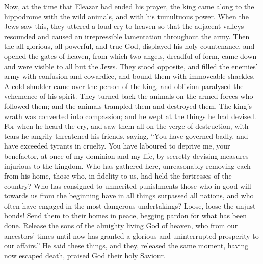  Now, at the time that Eleazar had ended his prayer, the
king came along to the hippodrome with the wild animals, and with his
tumultuous power.  When the Jews saw this, they uttered a
loud cry to heaven so that the adjacent valleys resounded and caused an
irrepressible lamentation throughout the army.  Then the
all-glorious, all-powerful, and true God, displayed his holy
countenance, and opened the gates of heaven, from which two angels,
dreadful of form, came down and were visible to all but the Jews.
 They stood opposite, and filled the enemies' army with
confusion and cowardice, and bound them with immoveable shackles.
 A cold shudder came over the person of the king, and
oblivion paralysed the vehemence of his spirit.  They
turned back the animals on the armed forces who followed them; and the
animals trampled them and destroyed them.  The king's wrath
was converted into compassion; and he wept at the things he had devised.
 For when he heard the cry, and saw them all on the verge
of destruction, with tears he angrily threatened his friends, saying,
 ``You have governed badly, and have exceeded tyrants in
cruelty. You have laboured to deprive me, your benefactor, at once of my
dominion and my life, by secretly devising measures injurious to the
kingdom.  Who has gathered here, unreasonably removing each
from his home, those who, in fidelity to us, had held the fortresses of
the country?  Who has consigned to unmerited punishments
those who in good will towards us from the beginning have in all things
surpassed all nations, and who often have engaged in the most dangerous
undertakings?  Loose, loose the unjust bonds! Send them to
their homes in peace, begging pardon for what has been done.
 Release the sons of the almighty living God of heaven, who
from our ancestors' times until now has granted a glorious and
uninterrupted prosperity to our affairs.''  He said these
things, and they, released the same moment, having now escaped death,
praised God their holy Saviour.

